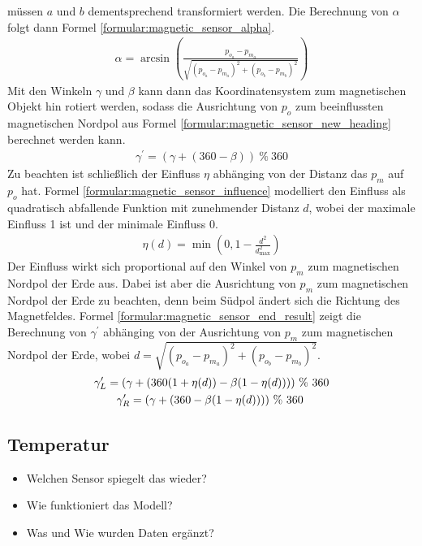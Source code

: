 müssen $a$ und $b$ dementsprechend transformiert werden.
Die Berechnung von $\alpha$ folgt dann Formel \ref{formular:magnetic_sensor_alpha}.
\begin{align}
    \label{formular:magnetic_sensor_alpha}
    \alpha = \arcsin (\frac{p_{o_a} - p_{m_a}}{\sqrt{(p_{o_a} - p_{m_a})^2 + (p_{o_b} - p_{m_b})^2}})
\end{align}
Mit den Winkeln $\gamma$ und $\beta$ kann dann das Koordinatensystem zum magnetischen Objekt hin rotiert werden,
sodass die Ausrichtung von $p_{o}$ zum beeinflussten magnetischen Nordpol aus Formel \ref{formular:magnetic_sensor_new_heading} berechnet werden kann.
\begin{align}
    \label{formular:magnetic_sensor_new_heading}
    \gamma^{\prime} = (\gamma + (360 - \beta))\ \%\ 360
\end{align}
Zu beachten ist schließlich der Einfluss $\eta$ abhänging von der Distanz das $p_{m}$ auf $p_{o}$ hat.
Formel \ref{formular:magnetic_sensor_influence} modelliert den Einfluss als quadratisch abfallende Funktion mit zunehmender Distanz $d$,
wobei der maximale Einfluss 1 ist und der minimale Einfluss 0.
\begin{align}
    \label{formular:magnetic_sensor_influence}
    \eta(d) = \min(0, 1 - \frac{d^2}{d_{\max}^2})
\end{align}
Der Einfluss wirkt sich proportional auf den Winkel von $p_{m}$ zum magnetischen Nordpol der Erde aus.
Dabei ist aber die Ausrichtung von $p_{m}$ zum magnetischen Nordpol der Erde zu beachten, denn beim Südpol ändert sich die Richtung des Magnetfeldes.
Formel \ref{formular:magnetic_sensor_end_result} zeigt die Berechnung von $\gamma^{\prime}$ abhänging von der Ausrichtung von $p_{m}$ zum magnetischen Nordpol der Erde,
wobei $d = \sqrt{(p_{o_a} - p_{m_a})^2 + (p_{o_b} - p_{m_b})^2}$.
\begin{align}
    \label{formular:magnetic_sensor_end_result}
    \gamma^{\prime}_L = (\gamma + (360(1 + \eta(d)) - \beta(1 - \eta(d))))\ \%\ 360 \\\nonumber
    \gamma^{\prime}_R = (\gamma + (360 - \beta(1 - \eta(d))))\ \%\ 360 \hspace{0.8cm}
\end{align}



\subsection{Temperatur}
\begin{itemize}
    \item Welchen Sensor spiegelt das wieder?
    \item Wie funktioniert das Modell?
    \item Was und Wie wurden Daten ergänzt?
\end{itemize}

